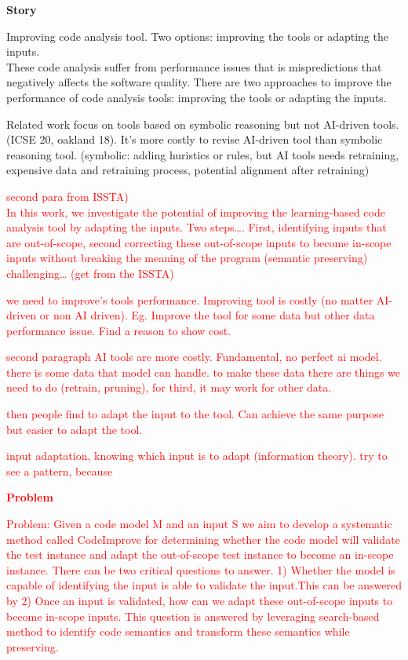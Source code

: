 \textbf{Story}

Improving code analysis tool. Two options: improving the tools or adapting the inputs. \\

These code analysis suffer from performance issues that is mispredictions that negatively affects the software quality.  There are two approaches to improve the performance of code analysis tools: improving the tools or adapting the inputs. 



Related work focus on tools based on symbolic reasoning but not AI-driven tools. (ICSE 20, oakland 18).
It’s more costly to revise AI-driven tool than symbolic reasoning tool. (symbolic: adding huristics or rules, but AI tools needs retraining, expensive data and retraining process, potential alignment after retraining) \textcolor{red}{second para from ISSTA)\\
In this work, we investigate the potential of improving the learning-based code analysis tool by adapting the inputs. 
Two steps…. First, identifying inputs that are out-of-scope, second correcting these out-of-scope inputs to become in-scope inputs without breaking the meaning of the program (semantic preserving) \\

challenging… (get from the ISSTA)

we need to improve's tools performance. Improving tool is costly (no matter AI-driven or non AI driven). Eg. Improve the tool for some data but other data performance issue. Find a reason to show cost. 

second paragraph AI tools are more costly. Fundamental, no perfect ai model. there is some data that model can handle. to make these data there are things we need to do (retrain, pruning), for third, it may work for other data. 

then people find to adapt the input to the tool. Can achieve the same purpose but easier to adapt the tool. 


input adaptation, knowing which input is to adapt (information theory). try to see a pattern, because 






\textbf{Problem}

Problem: Given a code model M and an input S we aim to develop a systematic method called CodeImprove for determining whether the code
model will validate the test instance and adapt the out-of-scope test instance to become an in-scope instance. There can be two critical questions to answer. 1) Whether the model is capable of identifying the input is able to validate the input.This can be answered by  2) Once an input is validated, how can we adapt these out-of-scope inputs to become in-scope inputs. This question is answered by leveraging search-based method to identify code semantics and transform these semantics while preserving. 

}
